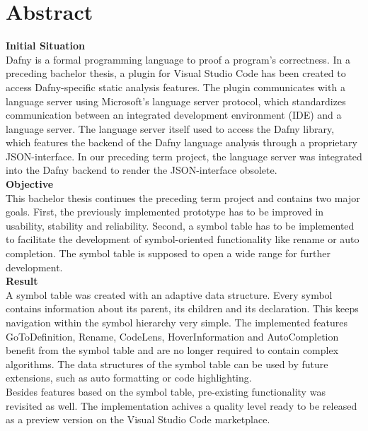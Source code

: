 \section{Abstract}
\label{section:abstract}

\textbf{Initial Situation}\\
Dafny is a formal programming language to proof a program's correctness.
In a preceding bachelor thesis, a plugin for Visual Studio Code has been created to access Dafny-specific static analysis features.
The plugin communicates with a language server using Microsoft's language server protocol, which standardizes communication between an integrated development environment (IDE) and a language server.
The language server itself used to access the Dafny library, which features the backend of the Dafny language analysis through a proprietary JSON-interface.
In our preceding term project, the language server was integrated into the Dafny backend to render the JSON-interface obsolete.\\

\textbf{Objective}\\
This bachelor thesis continues the preceding term project and contains two major goals.
First, the previously implemented prototype has to be improved in usability, stability and reliability.
Second, a symbol table has to be implemented to facilitate the development
of symbol-oriented functionality like rename or auto completion.
The symbol table is supposed to open a wide range for further development.\\

\textbf{Result}\\
A symbol table was created with an adaptive data structure.
Every symbol contains information about its parent, its children and its declaration.
This keeps navigation within the symbol hierarchy very simple.
The implemented features GoToDefinition, Rename, CodeLens, HoverInformation and AutoCompletion benefit from the symbol table and are no longer required to contain complex algorithms.
The data structures of the symbol table can be used by future extensions, such as auto formatting or code highlighting.\\

Besides features based on the symbol table, pre-existing functionality was revisited as well.
The implementation achives a quality level ready to be released as a preview version on the Visual Studio Code marketplace. 
